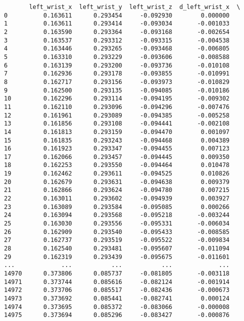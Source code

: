 \documentclass[11pt]{article}
\begin{document}
    
    
    \begin{verbatim}
       left_wrist_x  left_wrist_y  left_wrist_z  d_left_wrist_x  \
0          0.163611      0.293454     -0.092930        0.000000   
1          0.163611      0.293414     -0.093034       -0.001033   
2          0.163590      0.293364     -0.093168       -0.002654   
3          0.163537      0.293312     -0.093315       -0.004538   
4          0.163446      0.293265     -0.093468       -0.006805   
5          0.163310      0.293229     -0.093606       -0.008588   
6          0.163139      0.293200     -0.093736       -0.010108   
7          0.162936      0.293178     -0.093855       -0.010991   
8          0.162717      0.293156     -0.093973       -0.010829   
9          0.162500      0.293135     -0.094085       -0.010186   
10         0.162296      0.293114     -0.094195       -0.009302   
11         0.162110      0.293096     -0.094296       -0.007476   
12         0.161961      0.293089     -0.094385       -0.005258   
13         0.161856      0.293108     -0.094441       -0.002108   
14         0.161813      0.293159     -0.094470        0.001097   
15         0.161835      0.293243     -0.094468        0.004389   
16         0.161923      0.293347     -0.094455        0.007123   
17         0.162066      0.293457     -0.094445        0.009350   
18         0.162253      0.293550     -0.094464        0.010478   
19         0.162462      0.293611     -0.094525        0.010826   
20         0.162679      0.293631     -0.094638        0.009379   
21         0.162866      0.293624     -0.094780        0.007215   
22         0.163011      0.293602     -0.094939        0.003927   
23         0.163089      0.293584     -0.095085        0.000266   
24         0.163094      0.293568     -0.095218       -0.003244   
25         0.163030      0.293556     -0.095331       -0.006034   
26         0.162909      0.293540     -0.095433       -0.008585   
27         0.162737      0.293519     -0.095522       -0.009834   
28         0.162540      0.293481     -0.095607       -0.011094   
29         0.162319      0.293439     -0.095675       -0.011601   
...             ...           ...           ...             ...   
14970      0.373806      0.085737     -0.081805       -0.003118   
14971      0.373744      0.085616     -0.082124       -0.001914   
14972      0.373706      0.085517     -0.082436       -0.000673   
14973      0.373692      0.085441     -0.082741        0.000124   
14974      0.373695      0.085372     -0.083066       -0.000008   
14975      0.373694      0.085296     -0.083427       -0.000876   

\end{verbatim}
\end{document}
